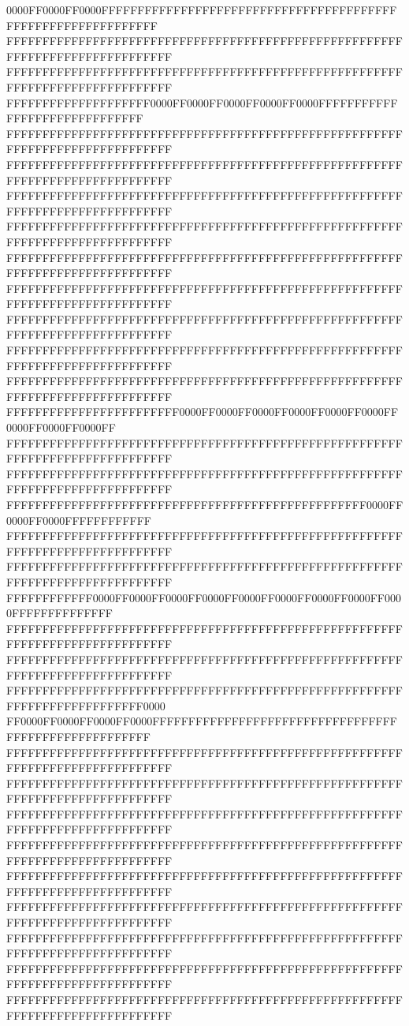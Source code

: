 0000FF0000FF0000FFFFFFFFFFFFFFFFFFFFFFFFFFFFFFFFFFFFFFFFFFFFFFFFFFFFFFFFFFFFFF
FFFFFFFFFFFFFFFFFFFFFFFFFFFFFFFFFFFFFFFFFFFFFFFFFFFFFFFFFFFFFFFFFFFFFFFFFFFFFF
FFFFFFFFFFFFFFFFFFFFFFFFFFFFFFFFFFFFFFFFFFFFFFFFFFFFFFFFFFFFFFFFFFFFFFFFFFFFFF
FFFFFFFFFFFFFFFFFFFF0000FF0000FF0000FF0000FF0000FFFFFFFFFFFFFFFFFFFFFFFFFFFFFF
FFFFFFFFFFFFFFFFFFFFFFFFFFFFFFFFFFFFFFFFFFFFFFFFFFFFFFFFFFFFFFFFFFFFFFFFFFFFFF
FFFFFFFFFFFFFFFFFFFFFFFFFFFFFFFFFFFFFFFFFFFFFFFFFFFFFFFFFFFFFFFFFFFFFFFFFFFFFF
FFFFFFFFFFFFFFFFFFFFFFFFFFFFFFFFFFFFFFFFFFFFFFFFFFFFFFFFFFFFFFFFFFFFFFFFFFFFFF
FFFFFFFFFFFFFFFFFFFFFFFFFFFFFFFFFFFFFFFFFFFFFFFFFFFFFFFFFFFFFFFFFFFFFFFFFFFFFF
FFFFFFFFFFFFFFFFFFFFFFFFFFFFFFFFFFFFFFFFFFFFFFFFFFFFFFFFFFFFFFFFFFFFFFFFFFFFFF
FFFFFFFFFFFFFFFFFFFFFFFFFFFFFFFFFFFFFFFFFFFFFFFFFFFFFFFFFFFFFFFFFFFFFFFFFFFFFF
FFFFFFFFFFFFFFFFFFFFFFFFFFFFFFFFFFFFFFFFFFFFFFFFFFFFFFFFFFFFFFFFFFFFFFFFFFFFFF
FFFFFFFFFFFFFFFFFFFFFFFFFFFFFFFFFFFFFFFFFFFFFFFFFFFFFFFFFFFFFFFFFFFFFFFFFFFFFF
FFFFFFFFFFFFFFFFFFFFFFFFFFFFFFFFFFFFFFFFFFFFFFFFFFFFFFFFFFFFFFFFFFFFFFFFFFFFFF
FFFFFFFFFFFFFFFFFFFFFFFF0000FF0000FF0000FF0000FF0000FF0000FF0000FF0000FF0000FF
FFFFFFFFFFFFFFFFFFFFFFFFFFFFFFFFFFFFFFFFFFFFFFFFFFFFFFFFFFFFFFFFFFFFFFFFFFFFFF
FFFFFFFFFFFFFFFFFFFFFFFFFFFFFFFFFFFFFFFFFFFFFFFFFFFFFFFFFFFFFFFFFFFFFFFFFFFFFF
FFFFFFFFFFFFFFFFFFFFFFFFFFFFFFFFFFFFFFFFFFFFFFFFFF0000FF0000FF0000FFFFFFFFFFFF
FFFFFFFFFFFFFFFFFFFFFFFFFFFFFFFFFFFFFFFFFFFFFFFFFFFFFFFFFFFFFFFFFFFFFFFFFFFFFF
FFFFFFFFFFFFFFFFFFFFFFFFFFFFFFFFFFFFFFFFFFFFFFFFFFFFFFFFFFFFFFFFFFFFFFFFFFFFFF
FFFFFFFFFFFF0000FF0000FF0000FF0000FF0000FF0000FF0000FF0000FF0000FFFFFFFFFFFFFF
FFFFFFFFFFFFFFFFFFFFFFFFFFFFFFFFFFFFFFFFFFFFFFFFFFFFFFFFFFFFFFFFFFFFFFFFFFFFFF
FFFFFFFFFFFFFFFFFFFFFFFFFFFFFFFFFFFFFFFFFFFFFFFFFFFFFFFFFFFFFFFFFFFFFFFFFFFFFF
FFFFFFFFFFFFFFFFFFFFFFFFFFFFFFFFFFFFFFFFFFFFFFFFFFFFFFFFFFFFFFFFFFFFFFFFFF0000
FF0000FF0000FF0000FF0000FFFFFFFFFFFFFFFFFFFFFFFFFFFFFFFFFFFFFFFFFFFFFFFFFFFFFF
FFFFFFFFFFFFFFFFFFFFFFFFFFFFFFFFFFFFFFFFFFFFFFFFFFFFFFFFFFFFFFFFFFFFFFFFFFFFFF
FFFFFFFFFFFFFFFFFFFFFFFFFFFFFFFFFFFFFFFFFFFFFFFFFFFFFFFFFFFFFFFFFFFFFFFFFFFFFF
FFFFFFFFFFFFFFFFFFFFFFFFFFFFFFFFFFFFFFFFFFFFFFFFFFFFFFFFFFFFFFFFFFFFFFFFFFFFFF
FFFFFFFFFFFFFFFFFFFFFFFFFFFFFFFFFFFFFFFFFFFFFFFFFFFFFFFFFFFFFFFFFFFFFFFFFFFFFF
FFFFFFFFFFFFFFFFFFFFFFFFFFFFFFFFFFFFFFFFFFFFFFFFFFFFFFFFFFFFFFFFFFFFFFFFFFFFFF
FFFFFFFFFFFFFFFFFFFFFFFFFFFFFFFFFFFFFFFFFFFFFFFFFFFFFFFFFFFFFFFFFFFFFFFFFFFFFF
FFFFFFFFFFFFFFFFFFFFFFFFFFFFFFFFFFFFFFFFFFFFFFFFFFFFFFFFFFFFFFFFFFFFFFFFFFFFFF
FFFFFFFFFFFFFFFFFFFFFFFFFFFFFFFFFFFFFFFFFFFFFFFFFFFFFFFFFFFFFFFFFFFFFFFFFFFFFF
FFFFFFFFFFFFFFFFFFFFFFFFFFFFFFFFFFFFFFFFFFFFFFFFFFFFFFFFFFFFFFFFFFFFFFFFFFFFFF
